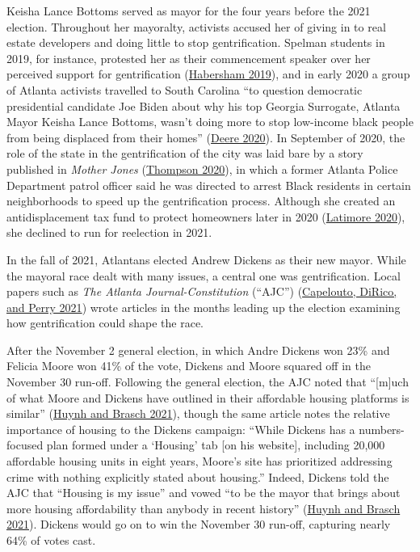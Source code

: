 \documentclass[
  12pt,
]{article}
\begin{document}
Keisha Lance Bottoms served as mayor for the four years before the 2021 election. Throughout her mayoralty, activists accused her of giving in to real estate developers and doing little to stop gentrification. Spelman students in 2019, for instance, protested her as their commencement speaker over her perceived support for gentrification (\protect\hyperlink{ref-Habersham2019}{Habersham 2019}), and in early 2020 a group of Atlanta activists travelled to South Carolina ``to question democratic presidential candidate Joe Biden about why his top Georgia Surrogate, Atlanta Mayor Keisha Lance Bottoms, wasn't doing more to stop low-income black people from being displaced from their homes'' (\protect\hyperlink{ref-Deere2020}{Deere 2020}). In September of 2020, the role of the state in the gentrification of the city was laid bare by a story published in \emph{Mother Jones} (\protect\hyperlink{ref-Thompson2020}{Thompson 2020}), in which a former Atlanta Police Department patrol officer said he was directed to arrest Black residents in certain neighborhoods to speed up the gentrification process. Although she created an antidisplacement tax fund to protect homeowners later in 2020 (\protect\hyperlink{ref-Latimore2020}{Latimore 2020}), she declined to run for reelection in 2021.

In the fall of 2021, Atlantans elected Andrew Dickens as their new mayor. While the mayoral race dealt with many issues, a central one was gentrification. Local papers such as \emph{The Atlanta Journal-Constitution} (``AJC'') (\protect\hyperlink{ref-Capelouto2021}{Capelouto, DiRico, and Perry 2021}) wrote articles in the months leading up the election examining how gentrification could shape the race.

After the November 2 general election, in which Andre Dickens won 23\% and Felicia Moore won 41\% of the vote, Dickens and Moore squared off in the November 30 run-off. Following the general election, the AJC noted that ``{[}m{]}uch of what Moore and Dickens have outlined in their affordable housing platforms is similar'' (\protect\hyperlink{ref-Huynh2021}{Huynh and Brasch 2021}), though the same article notes the relative importance of housing to the Dickens campaign: ``While Dickens has a numbers-focused plan formed under a `Housing' tab {[}on his website{]}, including 20,000 affordable housing units in eight years, Moore's site has prioritized addressing crime with nothing explicitly stated about housing.'' Indeed, Dickens told the AJC that ``Housing is my issue'' and vowed ``to be the mayor that brings about more housing affordability than anybody in recent history'' (\protect\hyperlink{ref-Huynh2021}{Huynh and Brasch 2021}). Dickens would go on to win the November 30 run-off, capturing nearly 64\% of votes cast.
\end{document}
